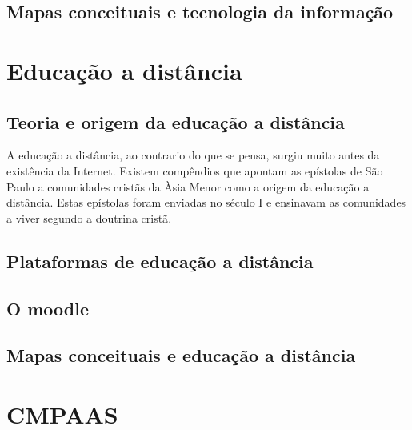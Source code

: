 \documentclass[
	12pt,				%
	openright,			%
	oneside,			%
	a4paper,			%
	english,			%
	french,				%
	spanish,			%
	brazil				%
	]{abntex2}
\begin{document}
\section{Mapas conceituais e tecnologia da informação}




\chapter{Educação a distância}
\section{Teoria e origem da educação a distância}
A educação a distância, ao contrario do que se pensa, surgiu muito antes da existência da Internet. Existem compêndios que apontam as epístolas de São Paulo a comunidades cristãs da Àsia Menor como a origem da educação a distância. Estas epístolas foram enviadas no século I e ensinavam as comunidades a viver segundo a doutrina cristã\cite{gouvea2006}.%
\section{Plataformas de educação a distância}
\section{O moodle}
\section{Mapas conceituais e educação a distância}

\lipsum[21-22]

\chapter{CMPAAS}
\end{document}

